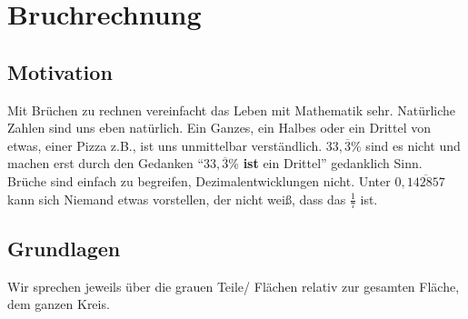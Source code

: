 \documentclass[a4paper]{book}%
\theoremstyle{definition}
\begin{document}
\chapter{Bruchrechnung}

\section{Motivation}

Mit Brüchen zu rechnen vereinfacht das Leben mit Mathematik sehr. Natürliche Zahlen sind uns eben natürlich. Ein Ganzes, ein Halbes oder ein Drittel von etwas, einer Pizza z.B., ist uns unmittelbar verständlich. $33,\overline{3}\%$ sind es nicht und machen erst durch den Gedanken \enquote{$33,\overline{3}$\% \textbf{ist} ein Drittel} gedanklich Sinn. Brüche sind einfach zu begreifen, Dezimalentwicklungen nicht. Unter $0,\overline{142857}$ kann sich Niemand etwas vorstellen, der nicht weiß, dass das $\frac{1}{7}$ ist.


\section{Grundlagen}\label{Bruchrechnung}

Wir sprechen jeweils über die grauen Teile/ Flächen relativ zur gesamten Fläche, dem ganzen Kreis.
\end{document}
